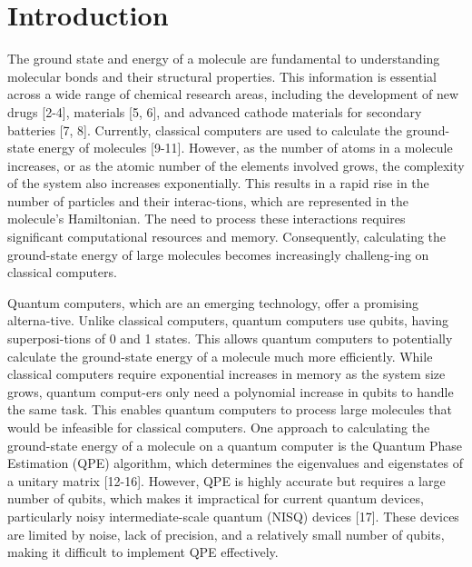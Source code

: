 \documentclass[pdflatex,sn-mathphys-num]{sn-jnl}%
\theoremstyle{thmstyleone}%
\theoremstyle{thmstyletwo}%
\theoremstyle{thmstylethree}%
\begin{document}
\section{Introduction}\label{sec1}

The ground state and energy of a molecule are fundamental to understanding molecular bonds and their structural properties. 
This information is essential across a wide range of chemical research areas, including the development of new drugs [2-4], materials [5, 6], and advanced cathode materials for secondary batteries [7, 8]. 
Currently, classical computers are used to calculate the ground-state energy of molecules [9-11].
However, as the number of atoms in a molecule increases, or as the atomic number of the elements involved grows, the complexity of the system also increases exponentially.
This results in a rapid rise in the number of particles and their interac-tions, which are represented in the molecule’s Hamiltonian. 
The need to process these interactions requires significant computational resources and memory. 
Consequently, calculating the ground-state energy of large molecules becomes increasingly challeng-ing on classical computers.

Quantum computers, which are an emerging technology, offer a promising alterna-tive. Unlike classical computers, quantum computers use qubits, having superposi-tions of  0 and 1 states. 
This allows quantum computers to potentially calculate the ground-state energy of a molecule much more efficiently. 
While classical computers require exponential increases in memory as the system size grows, quantum comput-ers only need a polynomial increase in qubits to handle the same task. 
This enables quantum computers to process large molecules that would be infeasible for classical computers.
One approach to calculating the ground-state energy of a molecule on a quantum computer is the Quantum Phase Estimation (QPE) algorithm, which determines the eigenvalues and eigenstates of a unitary matrix [12-16]. 
However, QPE is highly accurate but requires a large number of qubits, which makes it impractical for current quantum devices, particularly noisy intermediate-scale quantum (NISQ) devices [17]. 
These devices are limited by noise, lack of precision, and a relatively small number of qubits, making it difficult to implement QPE effectively.
\end{document}
